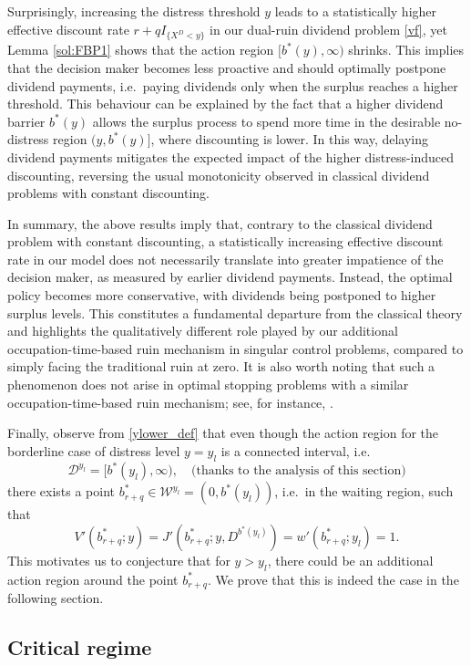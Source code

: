 \documentclass[11pt]{article} %
\numberwithin{komcounter}{section}
\numberwithin{equation}{section}
\numberwithin{theorem}{section}
\begin{document}
Surprisingly, increasing the distress threshold $y$ leads to a statistically higher effective discount rate $r + q I_{\{X^D<y\}}$ in our dual-ruin dividend problem \eqref{vf}, yet Lemma \ref{sol:FBP1} shows that the action region $[b^*(y), \infty)$ shrinks. 
This implies that the decision maker becomes less proactive and should optimally postpone dividend payments, i.e.~paying dividends only when the surplus reaches a higher threshold.
This behaviour can be explained by the fact that a higher dividend barrier $b^*(y)$ allows the surplus process to spend more time in the desirable no-distress region $(y,b^*(y)]$, where discounting is lower. In this way, delaying dividend payments mitigates the expected impact of the higher distress-induced discounting, reversing the usual monotonicity observed in classical dividend problems with constant discounting.


In summary, the above results imply that, contrary to the classical dividend problem with constant discounting, a statistically increasing effective discount rate in our model does not necessarily translate into greater impatience of the decision maker, as measured by earlier dividend payments.
Instead, the optimal policy becomes more conservative, with dividends being postponed to higher surplus levels.
This constitutes a fundamental departure from the classical theory and highlights the qualitatively different role played by our additional occupation-time-based ruin mechanism in singular control problems, compared to simply facing the traditional ruin at zero.
It is also worth noting that such a phenomenon does not arise in optimal stopping problems with a similar occupation-time-based ruin mechanism; see, for instance, \cite{neo_omega2018}.

Finally, observe from \eqref{ylower_def} that even though the action region for the borderline case of distress level $y=y_l$ is a connected interval, i.e. 
$$
\mathcal{D}^{y_l} = [b^*(y_l), \infty), \quad \text{(thanks to the analysis of this section)}
$$
there exists a point $b^*_{r+q} \in \mathcal{W}^{y_l} = (0, b^*(y_l))$, i.e.~in the waiting region, such that 
$$
V'(b^*_{r+q};y) 
= J'(b^*_{r+q};y,D^{b^*(y_l)}) 
= w'(b^*_{r+q};y_l) 
= 1.
$$
This motivates us to conjecture that for $y>y_l$, there could be an additional action region around the point $b^*_{r+q}$.
We prove that this is indeed the case in the following section.


\subsection{Critical regime} \label{sec_critical_regime}
\end{document}
